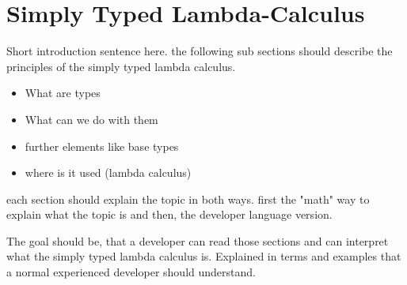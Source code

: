 \section{Simply Typed Lambda-Calculus}

Short introduction sentence here.
the following sub sections should describe
the principles of the simply typed lambda calculus.

\begin{itemize}
    \item What are types
    \item What can we do with them
    \item further elements like base types
    \item where is it used (lambda calculus)
\end{itemize}

each section should explain the topic in both ways.
first the "math" way to explain what the topic is and
then, the developer language version.

The goal should be, that a developer can read those sections
and can interpret what the simply typed lambda calculus is. Explained
in terms and examples that a normal experienced developer should understand.







